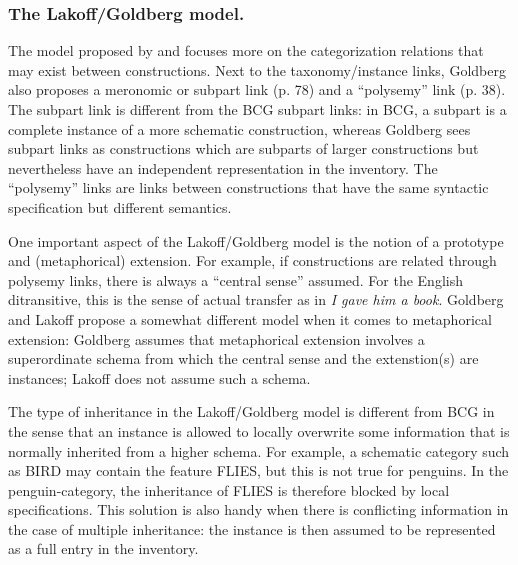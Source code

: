 \subsubsection{The Lakoff/Goldberg model.}
The model proposed by \citet{lakoff87woman} and \citet{goldberg95construction} focuses more on the categorization relations that may exist between constructions. Next to the taxonomy/instance links, Goldberg also proposes a meronomic or subpart link (p. 78) and a ``polysemy'' link (p. 38). The subpart link is different from the BCG subpart links: in BCG, a subpart is a complete instance of a more schematic construction, whereas Goldberg sees subpart links as constructions which are subparts of larger constructions but nevertheless have an independent representation in the inventory. The ``polysemy'' links are links between constructions that have the same syntactic specification but different semantics.

One important aspect of the Lakoff/Goldberg model is the notion of a prototype and (metaphorical) extension. For example, if constructions are related through polysemy links, there is always a ``central sense'' assumed. For the English ditransitive, this is the sense of actual transfer as in {\em I gave him a book}. Goldberg and Lakoff propose a somewhat different model when it comes to metaphorical extension: Goldberg assumes that metaphorical extension involves a superordinate schema from which the central sense and the extenstion(s) are instances; Lakoff does not assume such a schema.

The type of inheritance in the Lakoff/Goldberg model is different from BCG in the sense that an instance is allowed to locally overwrite some information that is normally inherited from a higher schema. For example, a schematic category such as BIRD may contain the feature FLIES, but this is not true for penguins. In the penguin-category, the inheritance of FLIES is therefore blocked by local specifications. This solution is also handy when there is conflicting information in the case of multiple inheritance: the instance is then assumed to be represented as a full entry in the inventory.



